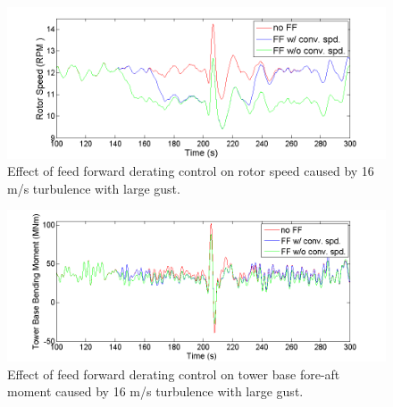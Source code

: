 \begin{figure}[htb]
	\centering
		\includegraphics[width = \linewidth]{Figures/ch4Figures/fig4-28.png}
		
	\caption{Effect of feed forward derating control on rotor speed caused by 16 m/s turbulence with large gust.}
	\label{fig4-28}
\end{figure}

\begin{figure}[htb]
	\centering
		\includegraphics[width = \linewidth]{Figures/ch4Figures/fig4-29.png}
		
	\caption{Effect of feed forward derating control on tower base fore-aft moment caused by 16 m/s turbulence with large gust.}
	\label{fig4-29}
\end{figure}

